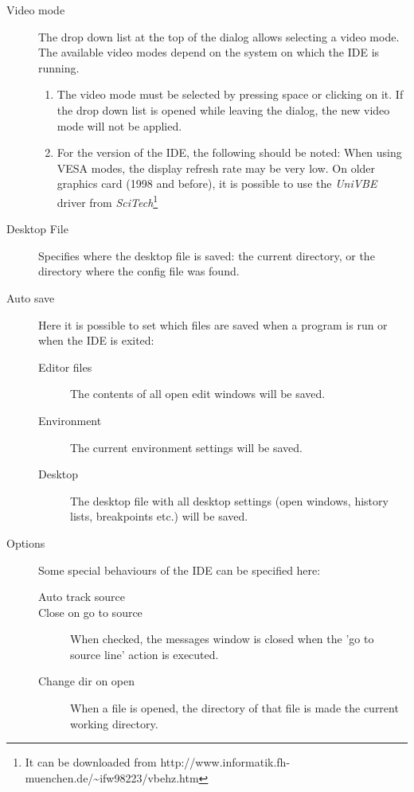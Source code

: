 \begin{description}
\item[Video mode]
The drop down list at the top of the dialog allows selecting a video mode.
The available video modes depend on the system on which the IDE
is running.
\begin{remark}
\begin{enumerate}
\item The video mode must be selected by pressing space or clicking
on it. If the drop down list is opened while leaving the dialog,
the new video mode will not be applied.
\item For the \dos version of the IDE, the following should be noted:
When using VESA modes, the display refresh rate may be very low.
On older graphics card (1998 and before), it is possible to use the
{\em UniVBE} driver from {\em SciTech}\footnote{It can be downloaded from
{http://www.informatik.fh-muenchen.de/\~{}ifw98223/vbehz.htm}}
\end{enumerate}
\end{remark}
\item[Desktop File]
Specifies where the desktop file is saved: the current directory, or the
directory where the config file was found.
\item[Auto save]
Here it is possible to set which files are saved when a program is run or
when the IDE is exited:
\begin{description}
\item[Editor files] The contents of all open edit windows will be saved.
\item[Environment] The current environment settings will be saved.
\item[Desktop] The desktop file with all desktop settings (open windows,
history lists, breakpoints etc.) will be saved.
\end{description}
\item[Options]
Some special behaviours of the IDE can be specified here:
\begin{description}
\item[Auto track source]
\item[Close on go to source] When checked, the messages window is closed
when the 'go to source line' action is executed.
\item[Change dir on open] When a file is opened, the directory of that file
is made the current working directory.
\end{description}
\end{description}
%
%
